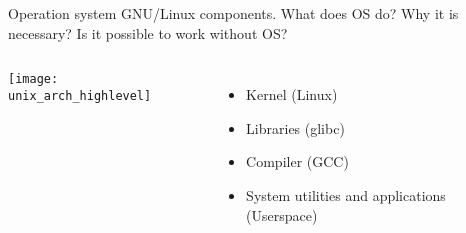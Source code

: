 \begin{frame}{Operation system GNU/Linux components.}
What does OS do? Why it is necessary? Is it possible to work without OS?
\pause
    \begin{columns}
    \texttt{[image: unix\_arch\_highlevel]}
	\begin{itemize}
		\item Kernel (Linux)
		\item Libraries (glibc)
                \item Compiler (GCC) 
		\item System utilities and applications (Userspace)
	\end{itemize}
    \end{columns}
\end{frame}

